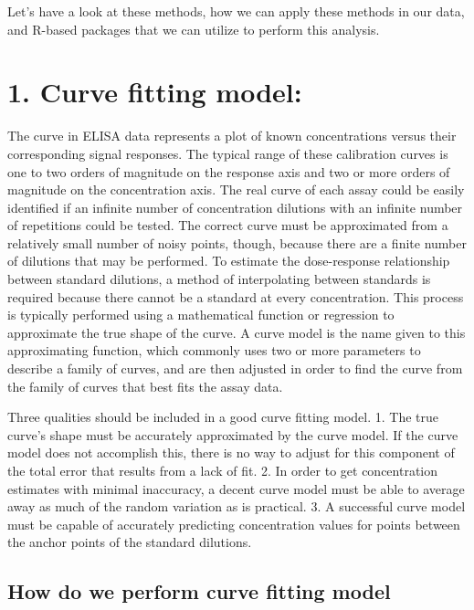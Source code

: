 \documentclass[
]{book}
\begin{document}
Let's have a look at these methods, how we can apply these methods in our data, and R-based packages that we can utilize to perform this analysis.

\hypertarget{curve-fitting-model}{%
\section{\texorpdfstring{\textbf{1. Curve fitting model:}}{1. Curve fitting model:}}\label{curve-fitting-model}}

The curve in ELISA data represents a plot of known concentrations versus their corresponding signal responses. The typical range of these calibration curves is one to two orders of magnitude on the response axis and two or more orders of magnitude on the concentration axis. The real curve of each assay could be easily identified if an infinite number of concentration dilutions with an infinite number of repetitions could be tested. The correct curve must be approximated from a relatively small number of noisy points, though, because there are a finite number of dilutions that may be performed. To estimate the dose-response relationship between standard dilutions, a method of interpolating between standards is required because there cannot be a standard at every concentration. This process is typically performed using a mathematical function or regression to approximate the true shape of the curve. A curve model is the name given to this approximating function, which commonly uses two or more parameters to describe a family of curves, and are then adjusted in order to find the curve from the family of curves that best fits the assay data.

Three qualities should be included in a good curve fitting model.
1. The true curve's shape must be accurately approximated by the curve model. If the curve model does not accomplish this, there is no way to adjust for this component of the total error that results from a lack of fit.
2. In order to get concentration estimates with minimal inaccuracy, a decent curve model must be able to average away as much of the random variation as is practical. 3. A successful curve model must be capable of accurately predicting concentration values for points between the anchor points of the standard dilutions.

\hypertarget{how-do-we-perform-curve-fitting-model}{%
\subsection{How do we perform curve fitting model}\label{how-do-we-perform-curve-fitting-model}}
\end{document}
